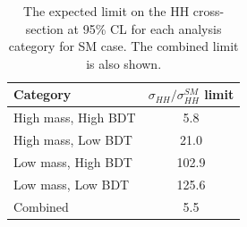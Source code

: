\begin{table}[htbp]
    \centering
    \begin{tabular}{lc}
        \hline\hline
        Category &  $\sigma_{HH}/\sigma_{HH}^{SM}$ limit \\
        \hline
        High mass, High BDT &  5.8 \\
        High mass, Low BDT &  21.0  \\
        Low mass, High BDT &  102.9 \\
        Low mass, Low BDT  &  125.6 \\
        \hline 
        Combined & 5.5 \\
        \hline\hline
    \end{tabular}
    \begin{tcolorbox}[colback=black!5!white,colframe=white!75!black]
    \caption{The expected limit on the HH cross-section at 95\% CL for each analysis category for SM case. The combined limit is also shown.}
    \label{tab:HHyybb:Results:Xsec:Cat}
    \end{tcolorbox}
\end{table}

